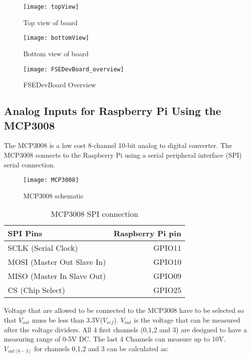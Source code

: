 \documentclass[
10pt, %
a4paper, %
oneside, %
headinclude,footinclude, %
BCOR=5mm, %
table,
]{scrartcl}
\begin{document}
\begin{figure}[h]
  \texttt{[image: topView]}
  \caption{Top view of board}\label{fig:Top view of board}
\endminipage\hfill
{}
  \texttt{[image: bottomView]}
  \caption{Bottom view of board}\label{fig:Bottom view of board}
\endminipage
\end{figure}

\begin{figure}[h]
\centering
\texttt{[image: FSEDevBoard\_overview]}
\caption[FSEDevBoard Overview]{FSEDevBoard Overview}
\label{fig:FSEDevBoard_overview}
\end{figure}

\subsection{Analog Inputs for Raspberry Pi Using the MCP3008}
The MCP3008 is a low cost 8-channel 10-bit analog to digital converter. The MCP3008 connects to the Raspberry Pi using a serial peripheral interface (SPI) serial connection. 

\begin{figure}[h]
\centering
\texttt{[image: MCP3008]} 
\caption[MCP3008 schematic]{MCP3008 schematic}
\label{fig:MCP3008}
\end{figure}

\begin{table}[H]
\centering
\begin{tabular}{lr}
\hline
SPI Pins & Raspberry Pi pin \\
\hline
SCLK (Serial Clock)        & GPIO11 \\
MOSI (Master Out Slave In) & GPIO10 \\
MISO (Master In Slave Out) & GPIO09 \\
CS   (Chip Select)         & GPIO25 \\
\hline
\end{tabular}
\label{tab:label}
\caption{MCP3008 SPI connection}
\end{table}

Voltage that are allowed to be connected to the MCP3008 have to be selected so that \(V_{out}\) muss be less than 3.3V(\(V_{ref}\)). \(V_{out}\) is the voltage that can be measured after the voltage dividers. All 4 first channels (0,1,2 and 3) are designed to have a measuring range of 0-5V DC. The last 4 Channels can measure up to 10V.
\(V_{out[0-3]}\) for channels 0,1,2 and 3 can be calculated as:
\end{document}
